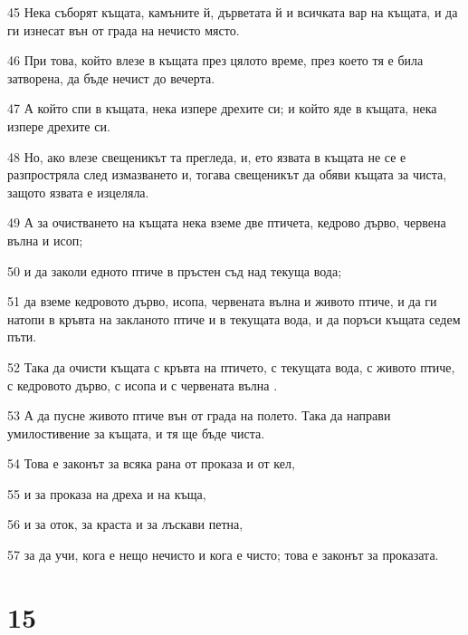 \par 45 Нека съборят къщата, камъните й, дърветата й и всичката вар на къщата, и да ги изнесат вън от града на нечисто място.
\par 46 При това, който влезе в къщата през цялото време, през което тя е била затворена, да бъде нечист до вечерта.
\par 47 А който спи в къщата, нека изпере дрехите си; и който яде в къщата, нека изпере дрехите си.
\par 48 Но, ако влезе свещеникът та прегледа, и, ето язвата в къщата не се е разпростряла след измазването и, тогава свещеникът да обяви къщата за чиста, защото язвата е изцеляла.
\par 49 А за очистването на къщата нека вземе две птичета, кедрово дърво, червена вълна и исоп;
\par 50 и да заколи едното птиче в пръстен съд над текуща вода;
\par 51 да вземе кедровото дърво, исопа, червената вълна и живото птиче, и да ги натопи в кръвта на закланото птиче и в текущата вода, и да поръси къщата седем пъти.
\par 52 Така да очисти къщата с кръвта на птичето, с текущата вода, с живото птиче, с кедровото дърво, с исопа и с червената вълна .
\par 53 А да пусне живото птиче вън от града на полето. Така да направи умилостивение за къщата, и тя ще бъде чиста.
\par 54 Това е законът за всяка рана от проказа и от кел,
\par 55 и за проказа на дреха и на къща,
\par 56 и за оток, за краста и за лъскави петна,
\par 57 за да учи, кога е нещо нечисто и кога е чисто; това е законът за проказата.

\chapter{15}

